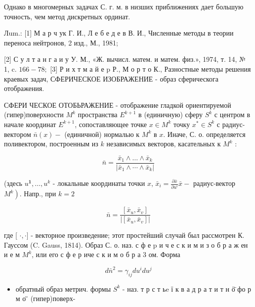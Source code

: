 \documentclass[10pt]{article}
\begin{document}
Однако в многомерных задачах С. г. м. в низших приближениях дает большую точность, чем метод дискретных ординат.



Лum.: [1] М а р ч ук Г. И., Л е б е д е в В. И., Численные методы в теории переноса нейтронов, 2 изд., М., 1981;

[2] С у л т а н г а и у У. М., «Ж. вычисл. матем. и матем. физ.», 1974, т. 14, № 1, c. $166-78 ;$ [3] Р и х т м а й е p Р., М о р т о К., Разностные методы решения краевых задач, СФЕРИЧЕСКОЕ ИЗОБРАЖЕНИЕ - образ сферическога отображения.



СФЕРИ ЧЕСКОЕ ОТОБЬРАЖЕНИЕ - отображение гладкой ориентируемой (гипер)поверхности $M^{k}$ пространства $E^{k+1}$ в (единичную) сферу $S^{k}$ с центром в начале координат $E^{k+1}$, сопоставляющее точке $x \in M^{k}$ точку $x^{*} \in S^{k}$ с радиус-вектором $\bar{n}(x)-$ (единичной) нормалью к $M^{k}$ в $x$. Иначе, С. о. определяется поливектором, построенным из $k$ независимых векторов, касательных к $M^{k}$ :



\[

\bar{n}=\frac{\bar{x}_{1} \wedge \ldots \wedge \bar{x}_{k}}{\left|\bar{x}_{1} \wedge \cdots \wedge \bar{x}_{k}\right|}

\]



(здесь $u^{\mathbf{1}}, \ldots, u^{k}$ - локальные координаты точки $x$, $\bar{x}_{i}=\frac{\partial \bar{x}}{\partial u^{i}} \bar{x}-$ радиус-вектор $\left.M^{k}\right)$. Напр., при $k=2$



\[

\bar{n}=\frac{\left[\bar{x}_{u}, \bar{x}_{v}\right]}{\left|\left[\bar{x}_{u}, \bar{x}_{v}\right]\right|}

\]



где [ $\cdot, \cdot]$ - векторное произведение; этот простейший случай был рассмотрен К. Гауссом (C. Gauss, 1814). Образ С. о. наз. с ф е $\mathrm{p}$ и ч е с к и м и з о б р а ж ен и е м $M^{k}$, или его с ф е р иче с к и м о б р а 3 ом. Форма



\[

d \bar{n}^{2}=\gamma_{i j} d u^{i} d u^{j}

\]



\begin{itemize}

  \item обратный образ метрич. формы $S^{k}$ - наз. т р с т ьe ї к в а д р а т и т н ӧ̈ фо р м о ̈̈ (гипер)поверх-

\end{itemize}
\end{document}
